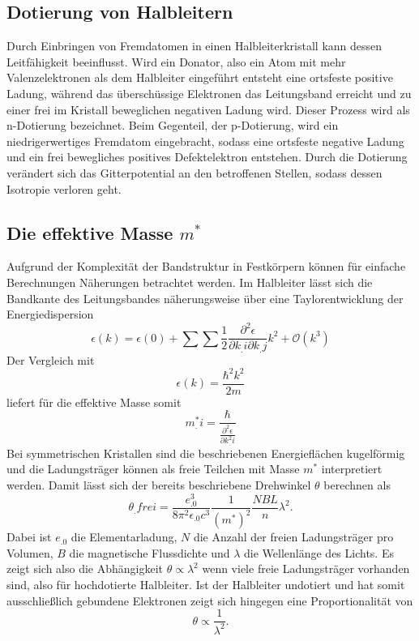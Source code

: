 \subsection{Dotierung von Halbleitern}
Durch Einbringen von Fremdatomen in einen Halbleiterkristall kann dessen Leitfähigkeit beeinflusst. Wird ein Donator, also ein Atom mit mehr Valenzelektronen als dem Halbleiter eingeführt entsteht eine ortsfeste positive Ladung, während das überschüssige Elektronen das Leitungsband erreicht und zu einer frei im Kristall beweglichen negativen Ladung wird. Dieser Prozess wird als n-Dotierung bezeichnet. Beim Gegenteil, der p-Dotierung, wird ein niedrigerwertiges Fremdatom eingebracht, sodass eine ortsfeste negative Ladung und ein frei bewegliches positives Defektelektron entstehen. Durch die Dotierung verändert sich das Gitterpotential an den betroffenen Stellen, sodass dessen Isotropie verloren geht.

\subsection{Die effektive Masse $m^*$}
Aufgrund der Komplexität der Bandstruktur in Festkörpern können für einfache Berechnungen Näherungen betrachtet werden.
Im Halbleiter lässt sich die Bandkante des Leitungsbandes näherungsweise über eine Taylorentwicklung der Energiedispersion
\begin{equation*}
\epsilon(k) = \epsilon(0) + \sum\sum\frac{1}{2}\frac{\partial^2\epsilon}{\partial k_.i\partial k_.j}k^2 + \mathcal{O}(k^3)
\end{equation*}
Der Vergleich mit
\[
\epsilon(k) = \frac{\hbar^2k^2}{2m}
\]
liefert für die effektive Masse somit
\begin{equation}
m^*_.i = \frac{\hbar}{\frac{\partial^2\epsilon}{\partial k^2_.i}}\label{eq:mstar}
\end{equation}
Bei symmetrischen Kristallen sind die beschriebenen Energieflächen kugelförmig und die Ladungsträger können als freie Teilchen mit Masse $m^*$ interpretiert werden.
Damit lässt sich der bereits beschriebene Drehwinkel $\theta$ berechnen als
\begin{equation}
\theta_.{frei} = \frac{e^3_.0}{8\pi^2\epsilon_.0c^3}\frac{1}{(m^*)^2}\frac{NBL}{n}\lambda^2\text{.}\label{eq:theta2}
\end{equation}
Dabei ist $e_.0$ die Elementarladung, $N$ die Anzahl der freien Ladungsträger pro Volumen, $B$ die magnetische Flussdichte und $\lambda$ die Wellenlänge des Lichts.
Es zeigt sich also die Abhängigkeit $\theta\propto \lambda^2$ wenn viele freie Ladungsträger vorhanden sind, also für hochdotierte Halbleiter. Ist der Halbleiter undotiert und hat somit ausschließlich gebundene Elektronen zeigt sich hingegen eine Proportionalität von
\begin{equation}
\theta\propto\frac{1}{\lambda^2}\text{.}\label{eq:theta3}
\end{equation}



